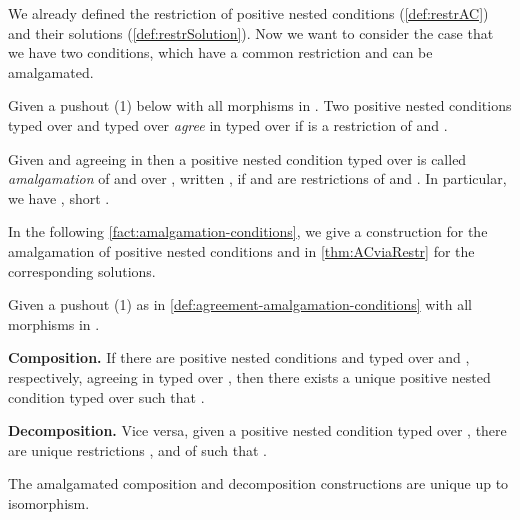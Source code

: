 We already defined the restriction of positive nested conditions (\autoref{def:restrAC}) and their solutions \linebreak (\autoref{def:restrSolution}). Now we want to consider the case that we have two conditions, which have a common restriction and can be amalgamated.


\begin{definition}\label{def:agreement-amalgamation-conditions}
	Given a pushout (1) below with all morphisms in \M. 
	Two positive nested conditions  typed over  and  typed over  \emph{agree} in 
	typed over  if  is a restriction of  and .
	
	Given  and  agreeing in  then a positive nested condition 
	 typed over  is called \emph{amalgamation} of  and  over
	, written , if  and  are restrictions of 
	and .
	In particular, we have , short .

\end{definition}

In the following \autoref{fact:amalgamation-conditions}, we give a construction for the amalgamation of positive nested conditions and in \autoref{thm:ACviaRestr} for the corresponding solutions.

\begin{fact}\label{fact:amalgamation-conditions}
	Given a pushout (1) as in \autoref{def:agreement-amalgamation-conditions} with all morphisms in \M. 
	\begin{description}
		\item \textbf{Composition.} 
			If there are positive nested conditions  and  typed over  and , respectively,
			agreeing in  typed over , then there exists a unique positive nested condition  typed over  such that 
			.
		\item \textbf{Decomposition.}
			Vice versa, given a positive nested condition  typed over , there are unique restrictions ,  and  
			of  such that .
	\end{description}
	The amalgamated composition and decomposition constructions are unique up to isomorphism.
	
\end{fact}

